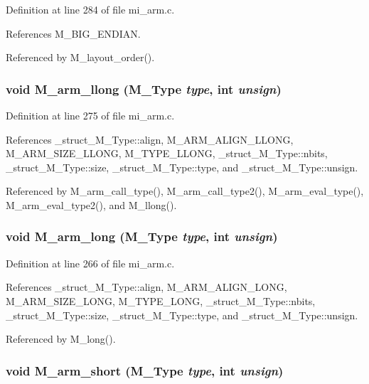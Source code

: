 Definition at line 284 of file mi\_\-arm.c.

References M\_\-BIG\_\-ENDIAN.

Referenced by M\_\-layout\_\-order().
\subsubsection{\setlength{\rightskip}{0pt plus 5cm}void M\_\-arm\_\-llong (\bf{M\_\-Type} {\em type}, int {\em unsign})}\label{mi__arm_8c_d9291a8a8f9beaf2e32111e3bfb63c57}




Definition at line 275 of file mi\_\-arm.c.

References \_\-struct\_\-M\_\-Type::align, M\_\-ARM\_\-ALIGN\_\-LLONG, M\_\-ARM\_\-SIZE\_\-LLONG, M\_\-TYPE\_\-LLONG, \_\-struct\_\-M\_\-Type::nbits, \_\-struct\_\-M\_\-Type::size, \_\-struct\_\-M\_\-Type::type, and \_\-struct\_\-M\_\-Type::unsign.

Referenced by M\_\-arm\_\-call\_\-type(), M\_\-arm\_\-call\_\-type2(), M\_\-arm\_\-eval\_\-type(), M\_\-arm\_\-eval\_\-type2(), and M\_\-llong().
\subsubsection{\setlength{\rightskip}{0pt plus 5cm}void M\_\-arm\_\-long (\bf{M\_\-Type} {\em type}, int {\em unsign})}\label{mi__arm_8c_1488931384d29acdb9676307725ea14a}




Definition at line 266 of file mi\_\-arm.c.

References \_\-struct\_\-M\_\-Type::align, M\_\-ARM\_\-ALIGN\_\-LONG, M\_\-ARM\_\-SIZE\_\-LONG, M\_\-TYPE\_\-LONG, \_\-struct\_\-M\_\-Type::nbits, \_\-struct\_\-M\_\-Type::size, \_\-struct\_\-M\_\-Type::type, and \_\-struct\_\-M\_\-Type::unsign.

Referenced by M\_\-long().
\subsubsection{\setlength{\rightskip}{0pt plus 5cm}void M\_\-arm\_\-short (\bf{M\_\-Type} {\em type}, int {\em unsign})}\label{mi__arm_8c_e6108d2e40eb42b66173929a0e0c6b13}




